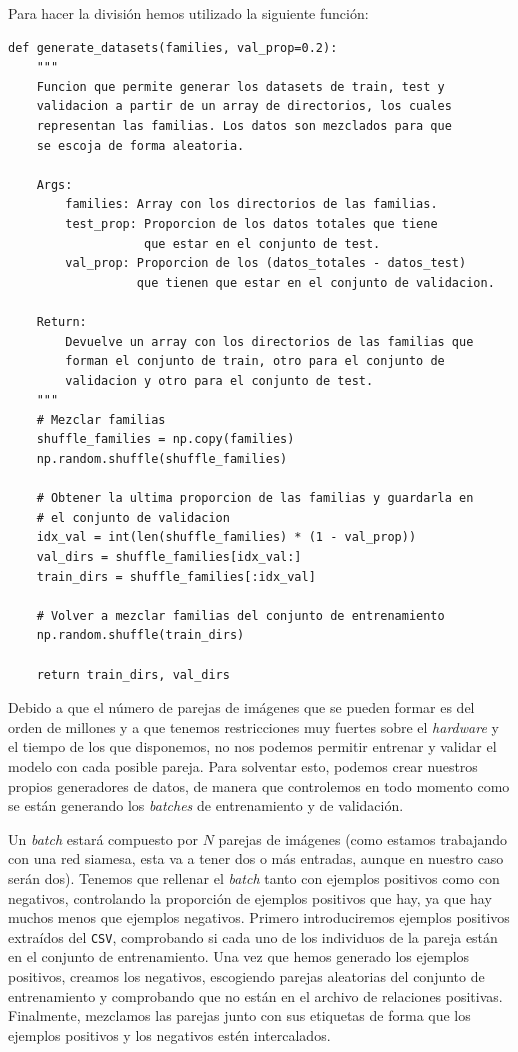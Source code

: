 \documentclass[11pt,a4paper]{article}
\begin{document}
Para hacer la división hemos utilizado la siguiente función:

\begin{lstlisting}
def generate_datasets(families, val_prop=0.2):
    """
    Funcion que permite generar los datasets de train, test y
    validacion a partir de un array de directorios, los cuales
    representan las familias. Los datos son mezclados para que
    se escoja de forma aleatoria.

    Args:
        families: Array con los directorios de las familias.
        test_prop: Proporcion de los datos totales que tiene
                   que estar en el conjunto de test.
        val_prop: Proporcion de los (datos_totales - datos_test)
                  que tienen que estar en el conjunto de validacion.
    
    Return:
        Devuelve un array con los directorios de las familias que
        forman el conjunto de train, otro para el conjunto de
        validacion y otro para el conjunto de test.
    """
    # Mezclar familias
    shuffle_families = np.copy(families)
    np.random.shuffle(shuffle_families)

    # Obtener la ultima proporcion de las familias y guardarla en
    # el conjunto de validacion
    idx_val = int(len(shuffle_families) * (1 - val_prop))
    val_dirs = shuffle_families[idx_val:]
    train_dirs = shuffle_families[:idx_val]

    # Volver a mezclar familias del conjunto de entrenamiento
    np.random.shuffle(train_dirs)

    return train_dirs, val_dirs
\end{lstlisting}

Debido a que el número de parejas de imágenes que se pueden formar es del orden de millones
y a que tenemos restricciones muy fuertes sobre el \textit{hardware} y el tiempo de los que disponemos,
no nos podemos permitir entrenar y validar el modelo con cada posible pareja. Para solventar esto, podemos
crear nuestros propios generadores de datos, de manera que controlemos en todo momento como se están generando
los \textit{batches} de entrenamiento y de validación.

Un \textit{batch} estará compuesto por $N$ parejas de imágenes (como estamos trabajando con una red siamesa, esta
va a tener dos o más entradas, aunque en nuestro caso serán dos). Tenemos que rellenar el \textit{batch} tanto con
ejemplos positivos como con negativos, controlando la proporción de ejemplos positivos que hay, ya que hay
muchos menos que ejemplos negativos. Primero introduciremos ejemplos positivos extraídos del \texttt{CSV}, comprobando
si cada uno de los individuos de la pareja están en el conjunto de entrenamiento. Una vez que hemos generado los
ejemplos positivos, creamos los negativos, escogiendo parejas aleatorias del conjunto de entrenamiento y comprobando
que no están en el archivo de relaciones positivas. Finalmente, mezclamos las parejas junto con sus etiquetas
de forma que los ejemplos positivos y los negativos estén intercalados.
\end{document}
